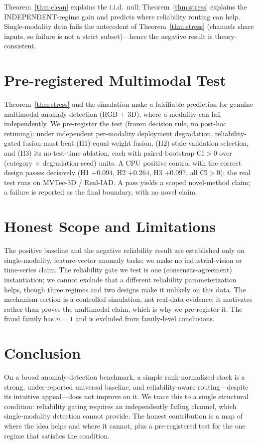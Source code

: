 \documentclass[11pt]{article}
\begin{document}
Theorem~\ref{thm:clean} explains the i.i.d.\ null; Theorem~\ref{thm:stress} explains the
INDEPENDENT-regime gain and predicts where reliability routing can help. Single-modality
data fails the antecedent of Theorem~\ref{thm:stress} (channels share inputs, so failure
is not a strict subset)---hence the negative result is theory-consistent.

\section{Pre-registered Multimodal Test}\label{sec:multimodal}
Theorem~\ref{thm:stress} and the simulation make a falsifiable prediction for genuine
multimodal anomaly detection (RGB $+$ 3D), where a modality can fail independently. We
pre-register the test (frozen decision rule, no post-hoc retuning): under independent
per-modality deployment degradation, reliability-gated fusion must beat (H1) equal-weight
fusion, (H2) stale validation selection, and (H3) its no-test-time ablation, each with
paired-bootstrap CI$>0$ over (category $\times$ degradation-seed) units. A CPU positive
control with the correct design passes decisively (H1 $+0.094$, H2 $+0.264$, H3 $+0.097$,
all CI$>0$); the real test runs on MVTec-3D / Real-IAD. A pass yields a scoped
novel-method claim; a failure is reported as the final boundary, with no novel claim.

\section{Honest Scope and Limitations}
The positive baseline and the negative reliability result are established only on
single-modality, feature-vector anomaly tasks; we make no industrial-vision or
time-series claim. The reliability gate we test is one (consensus-agreement)
instantiation; we cannot exclude that a different reliability parameterization helps,
though three regimes and two designs make it unlikely on this data. The mechanism
section is a controlled simulation, not real-data evidence; it motivates rather than
proves the multimodal claim, which is why we pre-register it. The fraud family has
$n{=}1$ and is excluded from family-level conclusions.

\section{Conclusion}
On a broad anomaly-detection benchmark, a simple rank-normalized stack is a strong,
under-reported universal baseline, and reliability-aware routing---despite its intuitive
appeal---does not improve on it. We trace this to a single structural condition:
reliability gating requires an independently failing channel, which single-modality
detection cannot provide. The honest contribution is a map of where the idea helps and
where it cannot, plus a pre-registered test for the one regime that satisfies the
condition.
\end{document}
